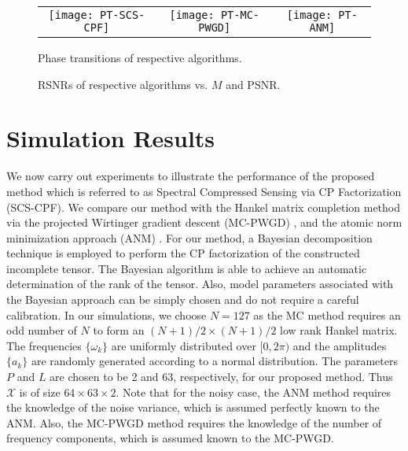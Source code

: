 \documentclass[10pt,journal,epsfig]{IEEEtran}
\begin{document}
\begin{figure*}[!t]
 \centering
\begin{tabular}{ccc}
\hspace*{-2ex}
\texttt{[image: PT-SCS-CPF]} &
\hspace*{-2ex}
\texttt{[image: PT-MC-PWGD]} &
\hspace*{-2ex}
\texttt{[image: PT-ANM]}
\end{tabular}
  \caption{Phase transitions of respective algorithms.}
   \label{fig1}
\end{figure*}


\begin{figure*}[!t]
 \centering
{}
 \hfil
{}
  \caption{RSNRs of respective algorithms vs. $M$ and PSNR.}
   \label{fig2}
\end{figure*}

\section{Simulation Results}
We now carry out experiments to illustrate the performance of the
proposed method which is referred to as Spectral Compressed
Sensing via CP Factorization (SCS-CPF). We compare our method with
the Hankel matrix completion method via the projected Wirtinger
gradient descent (MC-PWGD) \cite{CaiLiu15}, and the atomic norm
minimization approach (ANM) \cite{TangBhaskar13,BhaskarTang13}.
For our method, a Bayesian decomposition technique
\cite{ZhaoZhang15} is employed to perform the CP factorization of
the constructed incomplete tensor. The Bayesian algorithm is able
to achieve an automatic determination of the rank of the tensor.
Also, model parameters associated with the Bayesian approach can
be simply chosen and do not require a careful calibration. In our
simulations, we choose $N=127$ as the MC method \cite{CaiLiu15}
requires an odd number of $N$ to form an $(N+1)/2\times (N+1)/2$
low rank Hankel matrix. The frequencies $\{\omega_k\}$ are
uniformly distributed over $[0,2\pi)$ and the amplitudes $\{a_k\}$
are randomly generated according to a normal distribution. The
parameters $P$ and $L$ are chosen to be 2 and 63, respectively,
for our proposed method. Thus $\boldsymbol{\mathcal{X}}$ is of
size $64\times 63\times 2$. Note that for the noisy case, the ANM
method requires the knowledge of the noise variance, which is
assumed perfectly known to the ANM. Also, the MC-PWGD method
requires the knowledge of the number of frequency components,
which is assumed known to the MC-PWGD.
\end{document}
